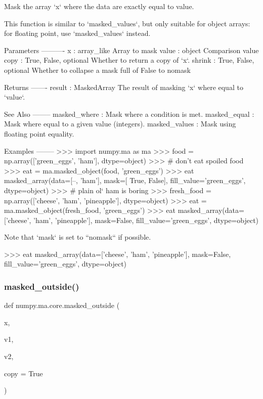 \begin{DoxyVerb}Mask the array `x` where the data are exactly equal to value.

This function is similar to `masked_values`, but only suitable
for object arrays: for floating point, use `masked_values` instead.

Parameters
----------
x : array_like
    Array to mask
value : object
    Comparison value
copy : {True, False}, optional
    Whether to return a copy of `x`.
shrink : {True, False}, optional
    Whether to collapse a mask full of False to nomask

Returns
-------
result : MaskedArray
    The result of masking `x` where equal to `value`.

See Also
--------
masked_where : Mask where a condition is met.
masked_equal : Mask where equal to a given value (integers).
masked_values : Mask using floating point equality.

Examples
--------
>>> import numpy.ma as ma
>>> food = np.array(['green_eggs', 'ham'], dtype=object)
>>> # don't eat spoiled food
>>> eat = ma.masked_object(food, 'green_eggs')
>>> eat
masked_array(data=[--, 'ham'],
             mask=[ True, False],
       fill_value='green_eggs',
            dtype=object)
>>> # plain ol` ham is boring
>>> fresh_food = np.array(['cheese', 'ham', 'pineapple'], dtype=object)
>>> eat = ma.masked_object(fresh_food, 'green_eggs')
>>> eat
masked_array(data=['cheese', 'ham', 'pineapple'],
             mask=False,
       fill_value='green_eggs',
            dtype=object)

Note that `mask` is set to ``nomask`` if possible.

>>> eat
masked_array(data=['cheese', 'ham', 'pineapple'],
             mask=False,
       fill_value='green_eggs',
            dtype=object)\end{DoxyVerb}
 \mbox{\label{namespacenumpy_1_1ma_1_1core_aa9fa72af95fe85b102c5fc38cceb50f5}} 
\subsubsection{\texorpdfstring{masked\+\_\+outside()}{masked\_outside()}}
{\footnotesize\ttfamily def numpy.\+ma.\+core.\+masked\+\_\+outside (\begin{DoxyParamCaption}\item[{}]{x,  }\item[{}]{v1,  }\item[{}]{v2,  }\item[{}]{copy = {\ttfamily True} }\end{DoxyParamCaption})}

